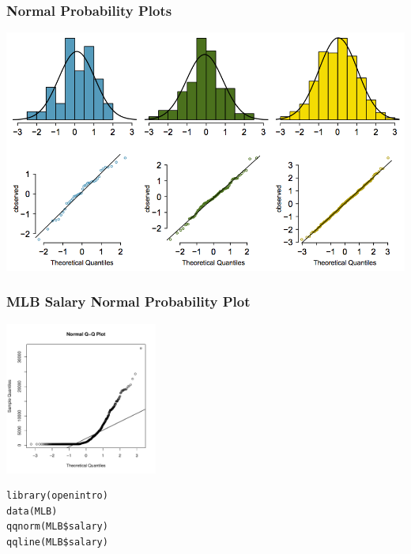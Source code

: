 \documentclass[handout]{beamer}
\begin{document}
\begin{frame}
\frametitle{Normal Probability Plots}
\begin{center}
\includegraphics[width=\textwidth]{figure/normal_hist2.png}
\end{center}
\end{frame}


\begin{frame}[fragile]
\frametitle{MLB Salary Normal Probability Plot}

\begin{center}
\includegraphics[width=5cm]{figure/MLB_qqplot.pdf}
\end{center}
\begin{verbatim}
library(openintro)
data(MLB)
qqnorm(MLB$salary)
qqline(MLB$salary)
\end{verbatim}
\end{frame}
\end{document}

